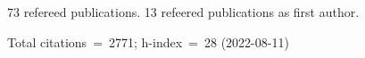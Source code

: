 73 refereed publications. 13 refeered publications as first author.

Total citations~=~2771; h-index~=~28 (2022-08-11)